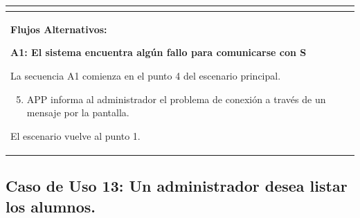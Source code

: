 \begin{longtable}{|l|p{5.5cm}|l|p{2cm}|l|p{1.9cm}|}
{    } \\ \hline

    \multicolumn{6}{|p{15cm}|}{ \textbf{Flujos Alternativos: }
    
    \textbf{A1: El sistema encuentra algún fallo para comunicarse con S}
    
    La secuencia A1 comienza en el punto 4 del escenario principal.
    \begin{enumerate}
        \setcounter{enumi}{4}
        \item APP informa al administrador el problema de conexión a través de un mensaje por la pantalla.
    \end{enumerate}

    El escenario vuelve al punto 1.

    } \\ \hline

\end{longtable}


\subsection{Caso de Uso 13: Un administrador desea listar los alumnos.}

